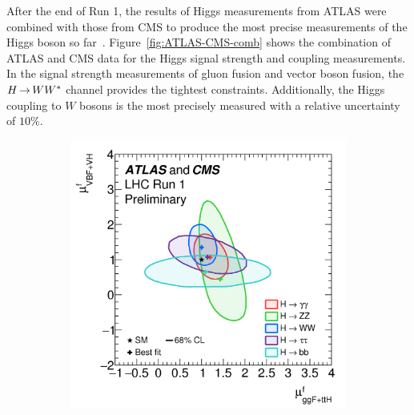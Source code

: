 After the end of Run 1, the results of Higgs measurements from ATLAS were combined with those from CMS to produce the most precise measurements of the Higgs boson so far~\cite{ATLASCMSHiggs}. Figure~\ref{fig:ATLAS-CMS-comb} shows the combination of ATLAS and CMS data for the Higgs signal strength and coupling measurements. In the signal strength measurements of gluon fusion and vector boson fusion, the $H{\,{\rightarrow}\,}WW^\ast$ channel provides the tightest constraints. Additionally, the Higgs coupling to $W$ bosons is the most precisely measured with a relative uncertainty of $10\%$. 

\begin{figure}[h!]
  \centering
  \captionsetup{justification=centering}

   \begin{subfigure}[t]{0.5\textwidth}
        \centering
        \includegraphics[width=\textwidth]{figures/ATLAS_CMS_mu}
        \caption{}
    \end{subfigure}%
    \begin{subfigure}[t]{0.5\textwidth}
        \centering

\end{subfigure}
\end{figure}
